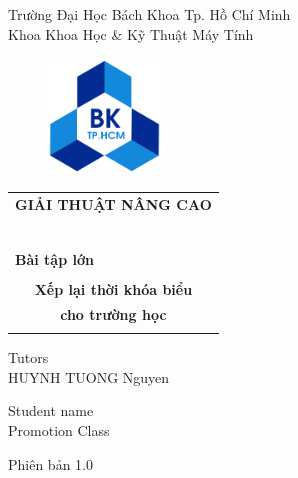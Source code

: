 \documentclass[11pt]{article}
\begin{document}
\begin{titlepage}
\begin{flushleft}
\noindent Trường Đại Học Bách Khoa Tp. Hồ Chí Minh\\
Khoa Khoa Học \& Kỹ Thuật Máy Tính\\
\end{flushleft}

\vspace{1cm}

\begin{figure}[h!]
\begin{center}
\includegraphics[width=3cm]{hcmut.png}
\end{center}
\end{figure}

\vspace{1cm}


\begin{center}
\begin{tabular}{c}
\multicolumn{1}{l}{\textbf{{\Large GIẢI THUẬT NÂNG CAO}}}\\
~~\\
\hline
\\
\multicolumn{1}{l}{\textbf{{\Large Bài tập lớn}}}\\
\\
\textbf{{\Huge Xếp lại thời khóa biểu}}\\
\textbf{{\Huge cho trường học}}\\
\\
\hline
\end{tabular}
\end{center}

\vspace{3cm}

\begin{minipage}[t]{0.60\linewidth}
Tutors \\ HUYNH TUONG Nguyen
\end{minipage}
\begin{minipage}[t]{0.40\linewidth}
Student name\\
Promotion Class\\
\end{minipage}

\begin{center}
Phiên bản 1.0
\end{center}
\end{titlepage}
\end{document}
